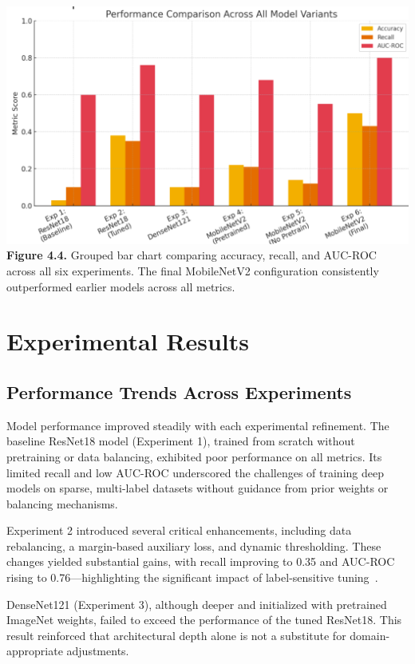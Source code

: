\documentclass[12pt]{article}
\begin{document}
\begin{multicols}{2}
\begin{center}
    \includegraphics[width=\linewidth]{figure4.4.png}
    \textbf{Figure 4.4.} Grouped bar chart comparing accuracy, recall, and AUC-ROC across all six experiments. The final MobileNetV2 configuration consistently outperformed earlier models across all metrics.
\end{center}

\section{Experimental Results}

\subsection{Performance Trends Across Experiments}
Model performance improved steadily with each experimental refinement. The baseline ResNet18 model (Experiment 1), trained from scratch without pretraining or data balancing, exhibited poor performance on all metrics. Its limited recall and low AUC-ROC underscored the challenges of training deep models on sparse, multi-label datasets without guidance from prior weights or balancing mechanisms.

Experiment 2 introduced several critical enhancements, including data rebalancing, a margin-based auxiliary loss, and dynamic thresholding. These changes yielded substantial gains, with recall improving to 0.35 and AUC-ROC rising to 0.76—highlighting the significant impact of label-sensitive tuning~\cite{12}.

DenseNet121 (Experiment 3), although deeper and initialized with pretrained ImageNet weights, failed to exceed the performance of the tuned ResNet18. This result reinforced that architectural depth alone is not a substitute for domain-appropriate adjustments.


\end{multicols}
\end{document}
